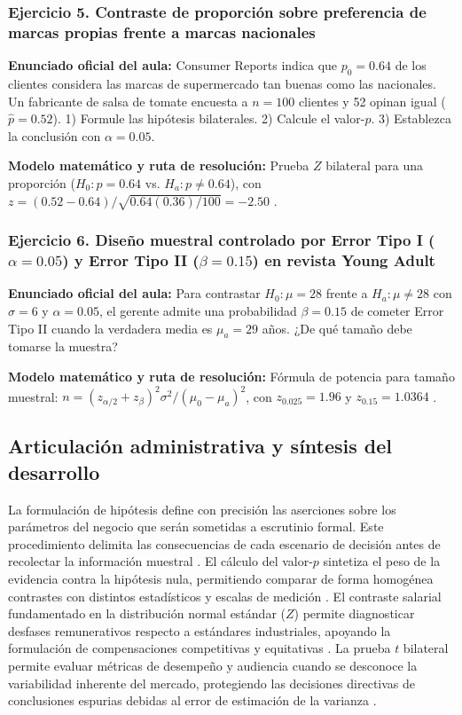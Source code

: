{\subsubsection*{Ejercicio 5. Contraste de proporción sobre preferencia de marcas propias frente a marcas nacionales}
\textbf{Enunciado oficial del aula:} Consumer Reports indica que $p_0 = 0.64$ de los clientes considera las marcas de supermercado tan buenas como las nacionales. Un fabricante de salsa de tomate encuesta a $n = 100$ clientes y 52 opinan igual ($\hat{p} = 0.52$). 1) Formule las hipótesis bilaterales. 2) Calcule el valor-$p$. 3) Establezca la conclusión con $\alpha = 0.05$.

\textbf{Modelo matemático y ruta de resolución:} Prueba $Z$ bilateral para una proporción ($H_0: p = 0.64$ vs. $H_a: p \ne 0.64$), con $z = (0.52 - 0.64)/\sqrt{0.64(0.36)/100} = -2.50$ \citep{anderson2012}.

\subsubsection*{Ejercicio 6. Diseño muestral controlado por Error Tipo I ($\alpha=0.05$) y Error Tipo II ($\beta=0.15$) en revista Young Adult}
\textbf{Enunciado oficial del aula:} Para contrastar $H_0: \mu = 28$ frente a $H_a: \mu \ne 28$ con $\sigma = 6$ y $\alpha = 0.05$, el gerente admite una probabilidad $\beta = 0.15$ de cometer Error Tipo II cuando la verdadera media es $\mu_a = 29$ años. ¿De qué tamaño debe tomarse la muestra?

\textbf{Modelo matemático y ruta de resolución:} Fórmula de potencia para tamaño muestral: $n = (z_{\alpha/2} + z_{\beta})^2 \sigma^2 / (\mu_0 - \mu_a)^2$, con $z_{0.025} = 1.96$ y $z_{0.15} = 1.0364$ \citep{anderson2012,wackerly2010}.


\subsection{Articulación administrativa y síntesis del desarrollo}
La formulación de hipótesis define con precisión las aserciones sobre los parámetros del negocio que serán sometidas a escrutinio formal. Este procedimiento delimita las consecuencias de cada escenario de decisión antes de recolectar la información muestral \citep{holmesBusiness2023,nistHandbook}.
El cálculo del valor-$p$ sintetiza el peso de la evidencia contra la hipótesis nula, permitiendo comparar de forma homogénea contrastes con distintos estadísticos y escalas de medición \citep{holmesBusiness2023,nistHandbook}.
El contraste salarial fundamentado en la distribución normal estándar ($Z$) permite diagnosticar desfases remunerativos respecto a estándares industriales, apoyando la formulación de compensaciones competitivas y equitativas \citep{holmesBusiness2023,nistHandbook}.
La prueba $t$ bilateral permite evaluar métricas de desempeño y audiencia cuando se desconoce la variabilidad inherente del mercado, protegiendo las decisiones directivas de conclusiones espurias debidas al error de estimación de la varianza \citep{holmesBusiness2023,nistHandbook}.

}
